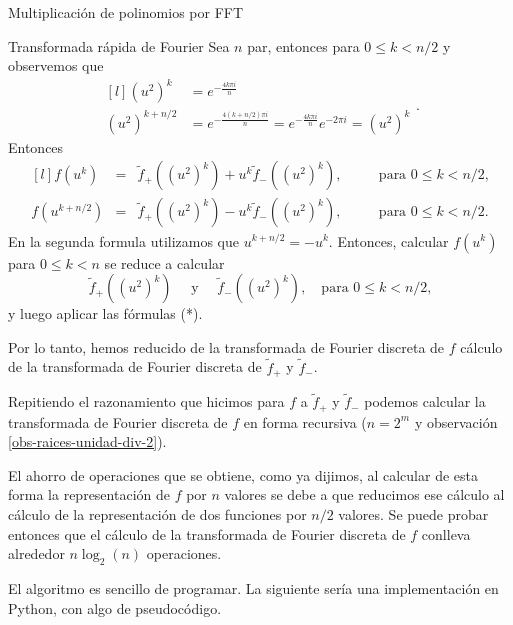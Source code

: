 \begin{chapter}{Multiplicación de polinomios por FFT}
\begin{section}{Transformada rápida de Fourier}
        Sea $n$ par, entonces para $0 \le k <n/2$ y observemos que 
        \begin{equation*}
            \begin{matrix*}[l]
                (u^2)^k &= e^{-\frac{4k\pi i}{n}}   \\
                (u^2)^{k+ n/2} &= e^{-\frac{4(k+n/2)\pi i}{n}}= e^{-\frac{4k\pi i}{n}}e^{-2\pi i}= (u^2)^k
            \end{matrix*}. 
        \end{equation*}
        Entonces
        \begin{equation*}
            \begin{matrix*}[l]
                f(u^k) &=& \tilde{f}_+((u^2)^k) + u^k \tilde{f}_-((u^2)^k),& \quad &\text{para $0 \le k < n/2$,} \\
                f(u^{k+n/2}) &=& \tilde{f}_+((u^2)^k) - u^{k} \tilde{f}_-((u^2)^k),& \quad &\text{para $0 \le k < n/2$.}
            \end{matrix*} \tag{*}
        \end{equation*}
    En la segunda formula utilizamos que $u^{k + n/2}= -u^k$. Entonces, calcular $f(u^k)$ para $0 \le k < n$ se reduce a calcular 
    $$
    \tilde{f}_+((u^2)^k) \quad\text{ y }\quad  \tilde{f}_-((u^2)^k), \quad \text{para $0 \le k < n/2$,}
    $$
    y  luego  aplicar las fórmulas (*). 
    
    Por lo tanto, hemos reducido de la transformada de Fourier discreta de $f$  cálculo de la transformada de Fourier discreta de $\tilde{f}_+$ y $\tilde{f}_-$.
    
    Repitiendo el razonamiento  que hicimos para $f$  a  $\tilde{f}_+$ y $\tilde{f}_-$ podemos calcular la transformada de Fourier discreta de $f$ en forma recursiva ($n = 2^m$ y observación \ref{obs-raices-unidad-div-2}).
    
    El ahorro de operaciones que se obtiene, como ya dijimos, al calcular de esta forma la representación de $f$ por $n$ valores se debe a que reducimos ese cálculo al cálculo de la representación de  dos funciones por $n/2$ valores. Se puede probar entonces que el cálculo de la transformada de Fourier discreta de $f$ conlleva alrededor $n\log_2(n)$ operaciones.

    El algoritmo es sencillo de programar. La siguiente sería una implementación en Python,  con algo de pseudocódigo.
    

\end{section}
\end{chapter}
